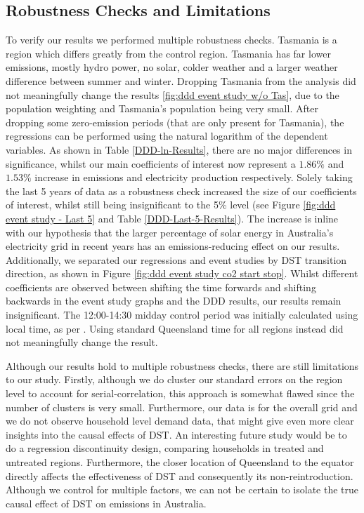 \subsection{Robustness Checks and Limitations}

To verify our results we performed multiple robustness checks. 
Tasmania is a region which differs greatly from the control region. Tasmania has far lower emissions, mostly hydro power, no solar, colder weather and a larger weather difference between summer and winter. Dropping Tasmania from the analysis did not meaningfully change the results \ref{fig:ddd event study w/o Tas}, due to the population weighting and Tasmania's population being very small.
After dropping some zero-emission periods (that are only present for Tasmania), the regressions can be performed using the natural logarithm of the dependent variables. As shown in Table \ref{DDD-ln-Results}, there are no major differences in significance, whilst our main coefficients of interest now represent a $1.86\%$ and $1.53\%$ increase in emissions and electricity production respectively. Solely taking the last 5 years of data as a robustness check increased the size of our coefficients of interest, whilst still being insignificant to the 5\% level (see Figure \ref{fig:ddd event study - Last 5} and Table \ref{DDD-Last-5-Results}). The increase is inline with our hypothesis that the larger percentage of solar energy in Australia's electricity grid in recent years has an emissions-reducing effect on our results. Additionally, we separated our regressions and event studies by DST transition direction, as shown in Figure \ref{fig:ddd event study co2 start stop}. Whilst different coefficients are observed between shifting the time forwards and shifting backwards in the event study graphs and the \ac{DDD} results, our results remain insignificant.
The 12:00-14:30 midday control period was initially calculated using local time, as per \cite{kellogg_daylight_2008}. Using standard Queensland time for all regions instead did not meaningfully change the result.

Although our results hold to multiple robustness checks, there are still limitations to our study. Firstly, although we do cluster our standard errors on the region level to account for serial-correlation, this approach is somewhat flawed since the number of clusters is very small. 
Furthermore, our data is for the overall grid and we do not observe household level demand data, that might give even more clear insights into the causal effects of \ac{DST}. An interesting future study would be to do a regression discontinuity design, comparing households in treated and untreated regions. Furthermore, the closer location of Queensland to the equator directly affects the effectiveness of \ac{DST} and consequently its non-reintroduction. Although we control for multiple factors, we can not be certain to isolate the true causal effect of \ac{DST} on emissions in Australia. 